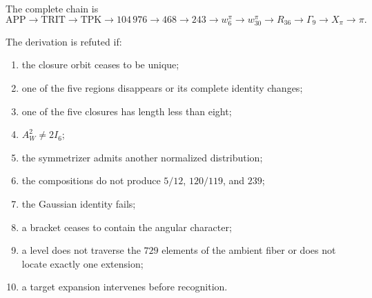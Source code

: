 The complete chain is
\[
 \mathrm{APP}\to\mathrm{TRIT}\to\mathrm{TPK}
 \to104\,976\to468\to243\to w_6^\pi
 \to w_{30}^\pi\to R_{36}\to\Gamma_9
 \to X_\pi\to\pi.
\]

\begin{remark}
The derivation is refuted if:
\begin{enumerate}
 \item the closure orbit ceases to be unique;
 \item one of the five regions disappears or its complete identity changes;
 \item one of the five closures has length less than eight;
 \item \(A_W^2\ne2I_6\);
 \item the symmetrizer admits another normalized distribution;
 \item the compositions do not produce \(5/12\), \(120/119\), and \(239\);
 \item the Gaussian identity fails;
 \item a bracket ceases to contain the angular character;
 \item a level does not traverse the \(729\) elements of the ambient fiber or does not
       locate exactly one extension;
 \item a target expansion intervenes before recognition.
\end{enumerate}
\end{remark}
